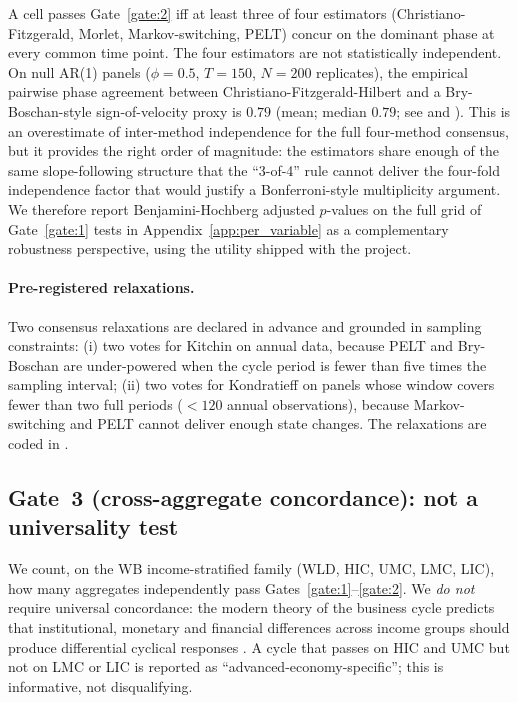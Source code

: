 A cell passes Gate~\ref{gate:2} iff at least three of four
estimators (Christiano-Fitzgerald, Morlet, Markov-switching,
PELT) concur on the dominant phase at every common time point.
The four estimators are not statistically independent.
On null AR(1) panels (\(\phi=0.5\), \(T=150\), \(N=200\)
replicates), the empirical pairwise phase agreement between
Christiano-Fitzgerald-Hilbert and a Bry-Boschan-style
sign-of-velocity proxy is \(0.79\) (mean; median \(0.79\); see
 and
). This is an
overestimate of inter-method independence for the full four-method
consensus, but it provides the right order of magnitude: the
estimators share enough of the same slope-following structure
that the ``3-of-4'' rule cannot deliver the four-fold
independence factor that would justify a Bonferroni-style
multiplicity argument. We therefore report Benjamini-Hochberg
adjusted \(p\)-values on the full grid of Gate~\ref{gate:1}
tests in Appendix~\ref{app:per_variable} as a complementary
robustness perspective, using the
utility shipped with the project.

\paragraph{Pre-registered relaxations.}
Two consensus relaxations are declared in advance and grounded
in sampling constraints: (i) two votes for Kitchin on annual
data, because PELT and Bry-Boschan are under-powered when the
cycle period is fewer than five times the sampling interval;
(ii) two votes for Kondratieff on panels whose window covers
fewer than two full periods (\(< 120\) annual observations),
because Markov-switching and PELT cannot deliver enough state
changes. The relaxations are coded in
.

\subsection{Gate~3 (cross-aggregate concordance): not a universality test}

We count, on the WB income-stratified family (WLD, HIC, UMC,
LMC, LIC), how many aggregates independently pass
Gates~\ref{gate:1}--\ref{gate:2}. We \emph{do not} require
universal concordance: the modern theory of the business cycle
predicts that institutional, monetary and financial differences
across income groups should produce differential cyclical
responses \citep{stock_watson2005}. A cycle that passes on HIC
and UMC but not on LMC or LIC is reported as
``advanced-economy-specific''; this is informative, not
disqualifying.

